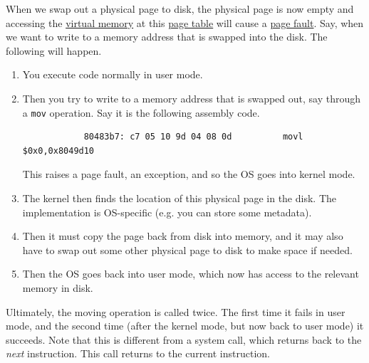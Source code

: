 \documentclass{article}
\newcounter{example}[section]
\newcounter{code}[section]
\begin{document}
    \begin{example}
      \label{ex:page-fault}
 
      When we swap out a physical page to disk, the physical page is now empty and accessing the \hyperref[def:virtual-memory]{virtual memory} at this \hyperref[def:page-table]{page table} will cause a \hyperref[def:page-fault]{page fault}. Say, when we want to write to a memory address that is swapped into the disk. The following will happen. 
      \begin{enumerate}
        \item You execute code normally in user mode. 
        \item Then you try to write to a memory address that is swapped out, say through a \texttt{mov} operation. Say it is the following assembly code. 

          \begin{lstlisting}
            80483b7: c7 05 10 9d 04 08 0d          movl $0x0,0x8049d10  
          \end{lstlisting}
          This raises a page fault, an exception, and so the OS goes into kernel mode. 
        \item The kernel then finds the location of this physical page in the disk. The implementation is OS-specific (e.g. you can store some metadata). 
        \item Then it must copy the page back from disk into memory, and it may also have to swap out some other physical page to disk to make space if needed.  
        \item Then the OS goes back into user mode, which now has access to the relevant memory in disk. 
      \end{enumerate}
      Ultimately, the moving operation is called twice. The first time it fails in user mode, and the second time (after the kernel mode, but now back to user mode) it succeeds. Note that this is different from a system call, which returns back to the \textit{next} instruction. This call returns to the current instruction. 
    \end{example}
\end{document}
